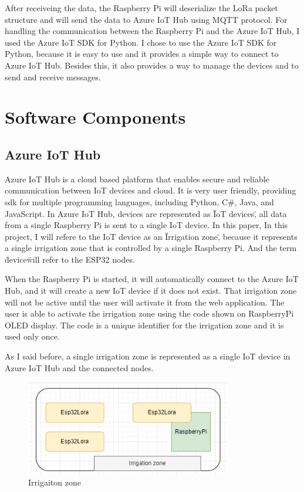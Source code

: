 After receiveing the data, the Raspberry Pi will deserialize 
the LoRa packet structure and will send the data to Azure IoT Hub 
using MQTT protocol. For handling the communication between the 
Raspberry Pi and the Azure IoT Hub, I used the Azure IoT SDK for Python.
I chose to use the Azure IoT SDK for Python, 
because it is easy to use and it provides a simple way to connect to 
Azure IoT Hub. Besides this, it also provides a way to manage the devices and 
to send and receive messages.

\section{Software Components}
\subsection{Azure IoT Hub}
Azure IoT Hub is a cloud based platform
that enables secure and reliable communication between IoT devices and cloud.
It is very user friendly, providing sdk for multiple programming languages, 
including Python, C\#, Java, and JavaScript. 
In Azure IoT Hub, 
devices are represented as \"IoT devices\", all data from a single Raspberry Pi is sent
to a single IoT device. In this paper, In this project, I will refere to the IoT device
as an \"Irrigation zone\", because it represents a single irrigation zone that is 
controlled by a single Raspberry Pi. And the term \"device\" will refer to the ESP32 nodes.

When the Raspberry Pi is started, it will automatically connect to the Azure IoT Hub,
and it will create a new IoT device if it does not exist. That irrigation zone will not be active
until the user will activate it from the web application. The user is able to
activate the irrigation zone using the code shown on RaspberryPi OLED display.
The code is a unique identifier for the irrigation zone and it is used only once.

As I said before, a single irrigation zone is represented as a single 
IoT device in Azure IoT Hub and the connected nodes. 
\begin{figure}[H]
    \centering
    \includegraphics[width=0.8\textwidth]{images/irrigation-zone.png}
    \caption{Irrigaiton zone}
    \label{fig:irrigation-zone}
\end{figure}

